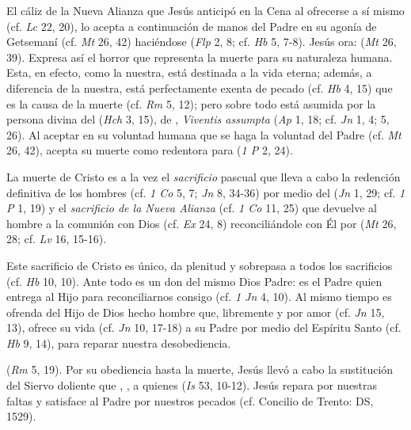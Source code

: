 \begin{ccebody}
 El cáliz de la Nueva Alianza que Jesús anticipó en la Cena al ofrecerse a sí mismo (cf. \textit{Lc} 22, 20), lo acepta a continuación de manos del Padre en su agonía de Getsemaní (cf. \textit{Mt} 26, 42) haciéndose  (\textit{Flp} 2, 8; cf. \textit{Hb} 5, 7-8). Jesús ora:  (\textit{Mt} 26, 39). Expresa así el horror que representa la muerte para su naturaleza humana. Esta, en efecto, como la nuestra, está destinada a la vida eterna; además, a diferencia de la nuestra, está perfectamente exenta de pecado (cf. \textit{Hb} 4, 15) que es la causa de la muerte (cf. \textit{Rm} 5, 12); pero sobre todo está asumida por la persona divina del  (\textit{Hch} 3, 15), de , \textit{Viventis assumpta} (\textit{Ap} 1, 18; cf. \textit{Jn} 1, 4; 5, 26). Al aceptar en su voluntad humana que se haga la voluntad del Padre (cf. \textit{Mt} 26, 42), acepta su muerte como redentora para  (\textit{1 P} 2, 24).


 La muerte de Cristo es a la vez el \textit{sacrificio} pascual que lleva a cabo la redención definitiva de los hombres (cf. \textit{1 Co} 5, 7; \textit{Jn} 8, 34-36) por medio del  (\textit{Jn} 1, 29; cf. \textit{1 P} 1, 19) y el \textit{sacrificio de la Nueva Alianza} (cf. \textit{1 Co} 11, 25) que devuelve al hombre a la comunión con Dios (cf. \textit{Ex} 24, 8) reconciliándole con Él por  (\textit{Mt} 26, 28; cf. \textit{Lv} 16, 15-16).

 Este sacrificio de Cristo es único, da plenitud y sobrepasa a todos los sacrificios (cf. \textit{Hb} 10, 10). Ante todo es un don del mismo Dios Padre: es el Padre quien entrega al Hijo para reconciliarnos consigo (cf. \textit{1 Jn} 4, 10). Al mismo tiempo es ofrenda del Hijo de Dios hecho hombre que, libremente y por amor (cf. \textit{Jn} 15, 13), ofrece su vida (cf. \textit{Jn} 10, 17-18) a su Padre por medio del Espíritu Santo (cf. \textit{Hb} 9, 14), para reparar nuestra desobediencia.


  (\textit{Rm} 5, 19). Por su obediencia hasta la muerte, Jesús llevó a cabo la sustitución del Siervo doliente que , , a quienes  (\textit{Is} 53, 10-12). Jesús repara por nuestras faltas y satisface al Padre por nuestros pecados (cf. Concilio de Trento: DS, 1529).


\end{ccebody}
